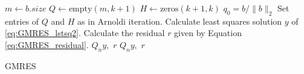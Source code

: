 \begin{algorithm}
\begin{algorithmic}[1]
	\State $m \gets b.size$						
	\State $Q \gets \text{empty}\left(m, k+1\right)$
	\State $H \gets \text{zeros}\left(k+1, k\right)$
	\State $q_0 = b/\|b\|_2$
        \State Set entries of $Q$ and $H$ as in Arnoldi iteration.
        \State Calculate least squares solution $y$ of \ref{eq:GMRES_lstsq2}.
        \State Calculate the residual $r$ given by Equation \ref{eq:GMRES_residual}.
            \State {} $Q_ny, \,\, r$
        \EndIf
    \EndFor
    \State {} $Q_ny, \,\, r$						
\EndProcedure
\end{algorithmic}
\caption{GMRES}
\label{alg:gmres}
\end{algorithm}


